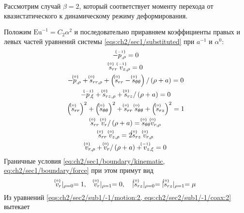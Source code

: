 Рассмотрим случай $\beta=2$, который соответствует моменту перехода от квазистатического к динамическому режиму деформирования.

Положим $\text{Eu}^{-1} = C_2 \alpha^2$ и последовательно приравняем коэффициенты правых и левых частей уравнений системы \cref{eqs:ch2/sec1/substituted} при $a^{-1}$ и $\alpha^0$:
\begingroup
\allowdisplaybreaks
\begin{subequations}
  \label{eqs:ch2/sec2/sub1/main}
  \begin{gather}
    \label{eqs:ch2/sec2/sub1/-1/motion:2}
    -\uindex{p}{-1}_{,\rho} = 0
    \\
    \label{eqs:ch2/sec2/sub1/-1/coax:2}
    \uindex{s}{0}_{rr} \; \uindex{v}{-1}_{z,\rho} = 0
    \\
    \label{eqs:ch2/sec2/sub1/0/motion:1}
    -\uindex{p}{0}_{,\rho}+\uindex{s}{0}_{rr,\rho} + \left(\uindex{s}{0}_{rr}-\uindex{s}{0}_{\theta\theta}\right) / \left(\rho + a\right) = 0
    \\
    \label{eqs:ch2/sec2/sub1/0/motion:2}
    -\uindex{p}{-1}_{,\xi} + \uindex{s}{0}_{rz,\rho} + \uindex{s}{0}_{rz} / \left(\rho+a\right) = 0
    \\
    \label{eqs:ch2/sec2/sub1/0/plasticity}
    \left(\uindex{s}{0}_{rr}\right)^2 + \left(\uindex{s}{0}_{\theta\theta}\right)^2 + \uindex{s}{0}_{rr}\; \uindex{s}{0}_{\theta\theta} + \left(\uindex{s}{0}_{rz}\right)^2 = 1
    \\
    \label{eqs:ch2/sec2/sub1/0/coax:1}
    \uindex{s}{0}_{rr} \; \uindex{v}{0}_{r} / \left(\rho+a\right) = \uindex{s}{0}_{\theta\theta} \uindex{v}{0}_{r,\rho}
    \\
    \label{eqs:ch2/sec2/sub1/0/coax:2}
    \uindex{s}{0}_{rr} \; \uindex{v}{0}_{z,\rho} = 2 \uindex{s}{0}_{rz} \; \uindex{v}{0}_{r,\rho}
    \\
    \label{eqs:ch2/sec2/sub1/0/uncompress}
    \uindex{v}{0}_{r,\rho} + \uindex{v}{0}_{r} / \left(\rho+a\right) + \uindex{v}{-1}_{z,\xi} = 0
  \end{gather}
\end{subequations}
\endgroup
Граничные условия \cref{eq:ch2/sec1/boundary/kinematic, eq:ch2/sec1/boundary/force} при этом примут вид
\begin{equation}
  \label{eq:ch2/sec2/sub1/boundary/0}
  \uindex{v}{0}_{r}\lvert_{\rho=0} = 1,\quad \uindex{v}{0}_{r}\lvert_{\rho=1} = 0, \quad \lvert \uindex{s}{0}_{rz}\lvert_{\rho=0} = \lvert \uindex{s}{0}_{rz}\lvert_{\rho=1} = \mu
\end{equation}
Из уравнений \cref{eqs:ch2/sec2/sub1/-1/motion:2, eqs:ch2/sec2/sub1/-1/coax:2} вытекает
